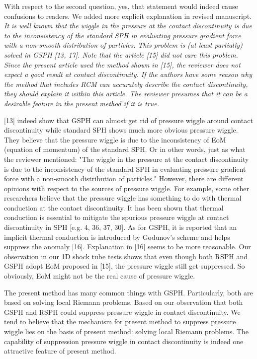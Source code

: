 \documentclass[10pt,a4paper]{article}
\begin{document}
With respect to the second question, yes, that statement would indeed cause confusions to readers. We added more explicit explanation in revised manuscript.
\\[3pt]

\textit {It is well known that the wiggle in the pressure at the contact discontinuity is due to the inconsistency of the standard SPH in evaluating pressure gradient force with a non-smooth distribution of particles. This problem is (at least partially) solved in GSPH [13, 17]. Note that the article [15] did not care this problem. Since the present article used the method shown in [15], the reviewer does not expect a good result at contact discontinuity. If the authors have some reason why the method that includes RCM can accurately describe the contact discontinuity, they should explain it within this article. The reviewer
presumes that it can be a desirable feature in the present method if it is true.}

[13] indeed show that GSPH can almost get rid of pressure wiggle around contact discontinuity while standard SPH shows much more obvious pressure wiggle. They believe that the pressure wiggle is due to the inconsistency of EoM (equation of momentum) of the standard SPH. Or in other words, just as what the reviewer mentioned: "The wiggle in the pressure at the contact discontinuity is due to the inconsistency of the standard SPH in evaluating pressure gradient force with a non-smooth distribution of particles." However, there are different opinions with respect to the sources of pressure wiggle. For example, some other researchers believe that the pressure wiggle has something to do with thermal conduction at the contact discontinuity. It has been shown that thermal conduction is essential to mitigate the spurious pressure wiggle at contact discontinuity in SPH [e.g. 4, 36, 37, 30]. As for GSPH, it is reported that an implicit thermal conduction is introduced by Godunov's scheme and helps suppress the anomaly [16]. Explanation in [16] seems to be more reasonable. Our observation in our 1D shock tube tests shows that even though both RSPH and GSPH adopt EoM proposed in [15], the pressure wiggle still get suppressed. So obviously, EoM might not be the real cause of pressure wiggle. 

The present method has many common things with GSPH. Particularly, both are based on solving local Riemann problems. Based on our observation that both GSPH and RSPH could suppress pressure wiggle in contact discontinuity. We tend to believe that the mechanism for present method to suppress pressure wiggle lies on the basis of present method: solving local Riemann problems. 
The capability of suppression pressure wiggle in contact discontinuity is indeed one attractive feature of present method.
\end{document}
